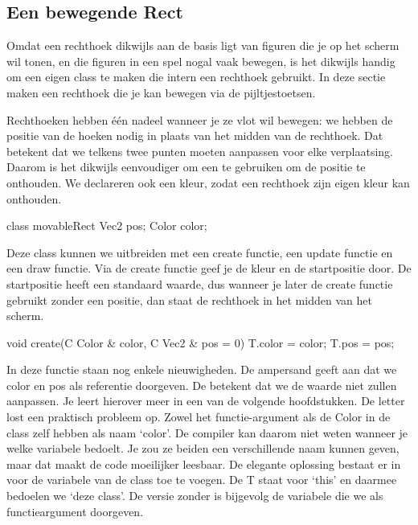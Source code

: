\subsection{Een bewegende Rect}
Omdat een rechthoek dikwijls aan de basis ligt van figuren die je op het scherm wil tonen, en die figuren in een spel nogal vaak bewegen, is het dikwijls handig om een eigen class te maken die intern een rechthoek gebruikt. In deze sectie maken een rechthoek die je kan bewegen via de pijltjestoetsen.

Rechthoeken hebben \'e\'en nadeel wanneer je ze vlot wil bewegen: we hebben de positie van de hoeken nodig in plaats van het midden van de rechthoek. Dat betekent dat we telkens twee punten moeten aanpassen voor elke verplaatsing. Daarom is het dikwijls eenvoudiger om een  te gebruiken om de positie te onthouden. We declareren ook een kleur, zodat een rechthoek zijn eigen kleur kan onthouden.

\begin{code}
class movableRect {
  Vec2 pos;
	Color color;
}
\end{code}

Deze class kunnen we uitbreiden met een create functie, een update functie en een draw functie. Via de create functie geef je de kleur en de startpositie door. De startpositie heeft een standaard waarde, dus wanneer je later de create functie gebruikt zonder een positie, dan staat de rechthoek in het midden van het scherm.

\begin{code}
void create(C Color & color, C Vec2 & pos = 0) {
  T.color = color;
	T.pos = pos;
}
\end{code}

\begin{note}
In deze functie staan nog enkele nieuwigheden. De ampersand geeft aan dat we color en pos als referentie doorgeven. De  betekent dat we de waarde niet zullen aanpassen. Je leert hierover meer in een van de volgende hoofdstukken. De letter  lost een praktisch probleem op. Zowel het functie-argument als de Color in de class zelf hebben als naam `color'. De compiler kan daarom niet weten wanneer je welke variabele bedoelt. Je zou ze beiden een verschillende naam kunnen geven, maar dat maakt de code moeilijker leesbaar. De elegante oplossing bestaat er in  voor de variabele van de class toe te voegen. De T staat voor `this' en daarmee bedoelen we `deze class'. De versie zonder  is bijgevolg de variabele die we als functieargument doorgeven.
\end{note}

